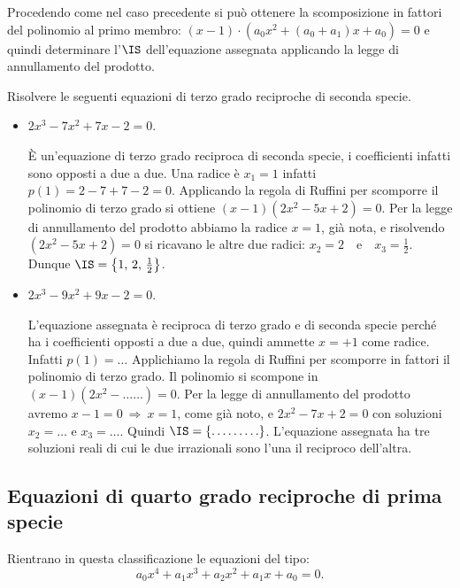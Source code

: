 Procedendo come nel caso precedente si può ottenere la scomposizione in fattori del polinomio al primo membro: $(x-1)\cdot \left(a_0x^2+(a_0+a_1)x+a_0\right)=0$ e quindi determinare l'$\IS$ dell'equazione assegnata applicando la legge di annullamento del prodotto.
\begin{exrig}
 \begin{esempio}
 Risolvere le seguenti equazioni di terzo grado reciproche di seconda specie.

 \begin{itemize}
 \item $ 2x^3-7x^2+7x-2=0 $.

 \`E un'equazione di terzo grado reciproca di seconda specie, i coefficienti infatti sono opposti a due a due. Una radice è $x_1=1$ infatti $p(1)=2-7+7-2=0$. Applicando la regola di Ruffini per scomporre il polinomio di terzo grado si ottiene $(x-1)\left(2x^2-5x+2\right)=0$. Per la legge di annullamento del prodotto abbiamo la radice $x=1$, già nota, e risolvendo $\left(2x^2-5x+2\right)=0$ si ricavano le altre due radici: $x_2=2$~~e~~$x_3=\frac 1 2$. Dunque $\IS=\left\{1\text{, }2\text{, }\frac 1 2\right\}$.

 \item $ 2x^3-9x^2+9x-2=0 $.

 L'equazione assegnata è reciproca di terzo grado e di seconda specie perché ha i coefficienti opposti a due a due, quindi ammette $x=+1$ come radice. Infatti $p(1)=\ldots$
 Applichiamo la regola di Ruffini per scomporre in fattori il polinomio di terzo grado. Il polinomio si scompone in $(x-1)\left(2x^2- \ldots \ldots\right)=0$. Per la legge di annullamento del prodotto avremo $x-1=0\:\Rightarrow\: x=1$, come già noto, e $2x^2-7x+2=0$ con soluzioni $x_2=\ldots $ e $x_3=\ldots $. Quindi $\IS=\{\ldots \ldots \ldots \}$. L'equazione assegnata ha tre soluzioni reali di cui le due irrazionali sono l'una il reciproco dell'altra.
 \end{itemize}
 \end{esempio}
\end{exrig}
\ovalbox{\risolvii \ref{ese:5.40}, \ref{ese:5.41}, \ref{ese:5.42}}

\subsection{Equazioni di quarto grado reciproche di prima specie}

Rientrano in questa classificazione le equazioni del tipo: \[a_0x^4+a_1x^3+a_2x^2+a_1x+a_0=0.\]

